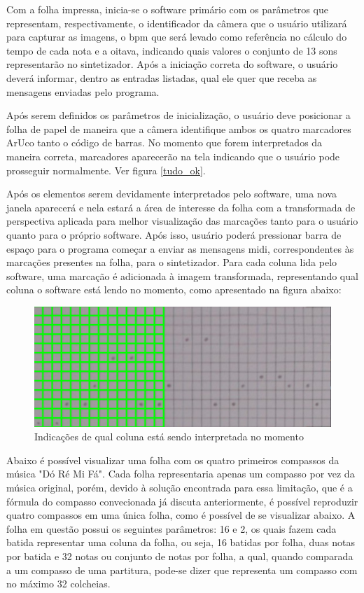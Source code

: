 \documentclass[12pt]{report}
\begin{document}
{Com a folha impressa, inicia-se o software primário com os parâmetros que representam, respectivamente, o identificador da câmera que o usuário utilizará para capturar as imagens, o bpm que será levado como referência no cálculo do tempo de cada nota e a oitava, indicando quais valores o conjunto de 13 sons representarão no sintetizador. Após a iniciação correta do software, o usuário deverá informar, dentro as entradas listadas, qual ele quer que receba as mensagens enviadas pelo programa.

Após serem definidos os parâmetros de inicialização, o usuário deve posicionar a folha de papel de maneira que a câmera identifique ambos os quatro marcadores ArUco tanto o código de barras. No momento que forem interpretados da maneira correta, marcadores aparecerão na tela indicando que o usuário pode prosseguir normalmente. Ver figura \ref{tudo_ok}.

Após os elementos serem devidamente interpretados pelo software, uma nova janela aparecerá e nela estará a área de interesse da folha com a transformada de perspectiva aplicada para melhor visualização das marcações tanto para o usuário quanto para o próprio software. Após isso, usuário poderá pressionar barra de espaço para o programa começar a enviar as mensagens midi, correspondentes às marcações presentes na folha, para o sintetizador. Para cada coluna lida pelo software, uma marcação é adicionada à imagem transformada, representando qual coluna o software está lendo no momento, como apresentado na figura abaixo:

\begin{figure}[H]
  \centering
  \includegraphics[width=1\textwidth]{imagens/area_transformada_preenchida.png}
  \caption{Indicações de qual coluna está sendo interpretada no momento}
  \label{fig:colunas_marcacoes}
\end{figure}

Abaixo é possível visualizar uma folha com os quatro primeiros compassos da música "Dó Ré Mi Fá". Cada folha representaria apenas um compasso por vez da música original, porém, devido à solução encontrada para essa limitação, que é a fórmula do compasso convecionada já discuta anteriormente, é possível reproduzir quatro compassos em uma única folha, como é possível de se visualizar abaixo. A folha em questão possui os seguintes parâmetros: 16 e 2, os quais fazem cada batida representar uma coluna da folha, ou seja, 16 batidas por folha, duas notas por batida e 32 notas ou conjunto de notas por folha, a qual, quando comparada a um compasso de uma partitura, pode-se dizer que representa um compasso com no máximo 32 colcheias.

}
\end{document}
